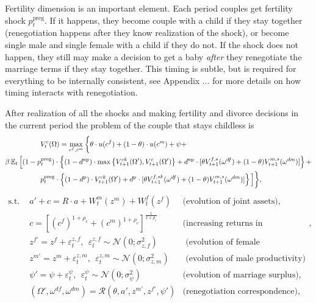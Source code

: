 Fertility dimension is an important element. Each period couples get fertility shock $p^{\text{preg}}_t$. If it happens, they become couple with a child if they stay together (renegotiation happens after they know realization of the shock), or become single male and single female with a child if they do not. If the shock does not happen, they still may make a decision to get a baby \emph{after} they renegotiate the marriage terms if they stay together. This timing is subtle, but is required for everything to be internally consistent, see Appendix ... for more details on how timing interacts with renegotiation. 

After realization of all the shocks and making fertility and divorce decisions in the current period the problem of the couple that stays childless is
\begin{align}& \hspace{5em}  V^{c}_t(\Omega) = \max\limits_{c^f,c^m}  \bigg\{ \theta\cdot u(c^f) + (1-\theta)\cdot u(c^m) + \psi +  \label{vf-c} \\   \nonumber
 &  \beta \operatorname{\mathbb{E}}_t \Big[   (1 - p^{\text{preg}}_t)\cdot \left\{ (1-d^{\text{np}})\cdot \max\left\{ V^{ck}_{t+1}(\Omega'),V^{c}_{t+1}(\Omega')\right\} + d^{\text{np}}\cdot [ \theta V_{t+1}^{f,s}(\omega^{df}) + (1-\theta)V_{t+1}^{m,s}(\omega^{dm})]\right\}  +  \\  \nonumber
& \hspace{5em} p^{\text{preg}}_t\cdot \left\{ (1-d^{\text{p}})\cdot V^{ck}_{t+1}(\Omega') + d^{\text{p}}\cdot [ \theta V_{t+1}^{f,sk}(\omega^{df}) + (1-\theta)V_{t+1}^{m,s}(\omega^{dm})]\right\} \Big] \bigg\},
\end{align}\vspace{-2em}
\begin{align*}
\text{s.t. \ }& a' + c = R\cdot a  + W^m_t(z^m) + W^f_t(z^f) & \text{(evolution of joint assets)},\\
				 & c = [(c^f)^{1+\rho_c} + (c^m)^{1+\rho_c}]^{\frac1{1+\rho_c}} & \text{(increasing returns in consumption)},\\
				 &  z^{f\prime} = z^f + \varepsilon^{z,f}_t, \ \ \varepsilon^{z,f}_t \sim \mathcal{N}(0;\sigma_{z,f}^2) &  \text{ (evolution of female productivity)}\\
				 &  z^{m\prime} = z^m + \varepsilon^{z,m}_t, \ \ \varepsilon^{z,m}_t \sim \mathcal{N}(0;\sigma_{z,m}^2) &  \text{ (evolution of male productivity)}\\
                    & \psi' = \psi + \varepsilon^{\psi}_t, \ \ \varepsilon^{\psi}_t \sim \mathcal{N}(0;\sigma_{\psi}^2)  & \text{(evolution of marriage surplus),} \\
                    & (\Omega',\omega^{df},\omega^{dm}) = \mathcal{R}(\theta,a',z^{m\prime},z^{f\prime},\psi') & \text{(renegotiation correspondence)},
\end{align*}

